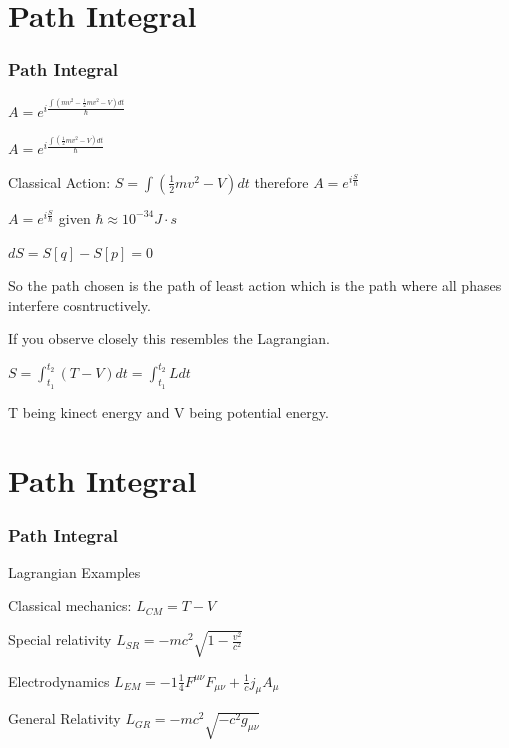 \documentclass{beamer}
\begin{document}
\section{Path Integral}
\begin{frame}
\frametitle{Path Integral}

$A = e^{i \frac{\int \left( mv^{2} -\frac{1}{2} mv^{2} - V\right) d t}{\hbar}}$

$A = e^{i \frac{\int \left( \frac{1}{2} mv^{2} - V\right) d t}{\hbar}}$

Classical Action: $S = \int \left( \frac{1}{2} mv^{2} - V\right) d t$ therefore $A = e^{i \frac{S}{\hbar}}$

$A = e^{i \frac{S}{\hbar}}$ given $\hbar \approx 10^{-34} J \cdot s$

$dS = S[q] - S[p] = 0$

So the path chosen is the path of least action which is the path where all phases interfere cosntructively.

If you observe closely this resembles the Lagrangian.

$S = \int_{t_{1}}^{t_{2}} \left(T - V\right)dt = \int_{t_{1}}^{t_{2}} Ldt$

T being kinect energy and V being potential energy.

\end{frame}


\section{Path Integral}
\begin{frame}
\frametitle{Path Integral}

Lagrangian Examples

Classical mechanics: $L_{CM} = T - V$

Special relativity $L_{SR} = -mc^{2} \sqrt{1 - \frac{v^{2}}{c^{2}}}$



Electrodynamics $L_{EM} = -1\frac{1}{4} F^{\mu \nu}F_{\mu \nu} + \frac{1}{c} j_{\mu}A_{\mu}$


General Relativity $L_{GR} = -mc^{2} \sqrt{-c^{2}g_{\mu \nu}}$

\end{frame}
\end{document}
